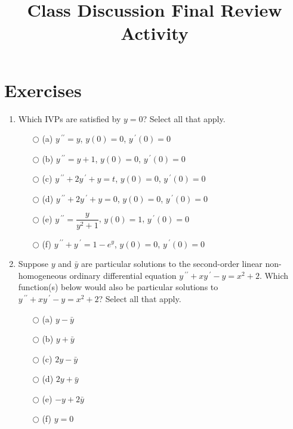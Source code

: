\documentclass{ximera}
\begin{document}
\begin{abstract}
 \end{abstract}

    \title{Class Discussion Final Review Activity}
    
    \maketitle

\section*{Exercises}



\begin{enumerate}[label=(\arabic*)]

\item Which IVPs are satisfied by $y=0$?   Select all that apply.

\begin{enumerate}[label=(\alph*)]
		\item[$\bigcirc$ (a)] $y\,^{\prime\prime}=y$, $y(0)=0$, $y\,^{\prime}(0)=0$%
		\item[$\bigcirc$ (b)] $y\,^{\prime\prime}=y+1$, $y(0)=0$, $y\,^{\prime}(0)=0$
		\item[$\bigcirc$ (c)] $y\,^{\prime\prime}+2y\,^{\prime}+y=t$, $y(0)=0$, $y\,^{\prime}(0)=0$
		\item[$\bigcirc$ (d)] $y\,^{\prime\prime}+2y\,^{\prime}+y=0$, $y(0)=0$, $y\,^{\prime}(0)=0$ %
		\item[$\bigcirc$ (e)] $y\,^{\prime\prime}=\dfrac{y}{y^2+1}$, $y(0)=1$, $y\,^{\prime}(0)=0$
     	\item[$\bigcirc$ (f)] $y\,^{\prime\prime}+y\,^{\prime}=1-e^y$, $y(0)=0$, $y\,^{\prime}(0)=0$  %
\end{enumerate}




\item Suppose $y$ and $\bar{y}$ are particular solutions to the second-order linear non-homogeneous ordinary differential equation $y\,^{\prime\prime}+xy\,^{\prime}-y=x^2+2$.  Which function(s) below would also be particular solutions to \\$y\,^{\prime\prime}+xy\,^{\prime}-y=x^2+2$?   Select all that apply.

\begin{enumerate}[label=(\alph*)]
		\item[$\bigcirc$ (a)] $y-\bar{y}$
		\item[$\bigcirc$ (b)] $y+\bar{y}$
		\item[$\bigcirc$ (c)] $2y-\bar{y}$  %
		\item[$\bigcirc$ (d)] $2y+\bar{y}$ 
     	\item[$\bigcirc$ (e)] $-y+2\bar{y}$ %
     	\item[$\bigcirc$ (f)] $y=0$
\end{enumerate}


\end{enumerate}
\end{document}

